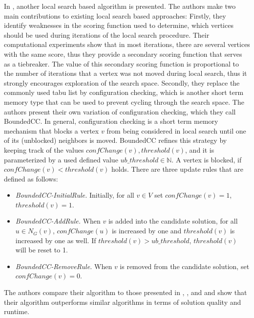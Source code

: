 \documentclass[draft,final]{vutinfth} %
\begin{document}
In \cite{chen_nuqclq_2021}, another local search based algorithm is presented. The authors make two main contributions to existing local search based approaches: Firstly, they identify weaknesses in the scoring function used to determine, which vertices should be used during iterations of the local search procedure. Their computational experiments show that in most iterations, there are several vertices with the same score, thus they provide a secondary scoring function that serves as a tiebreaker. The value of this secondary scoring function is proportional to the number of iterations that a vertex was not moved during local search, thus it strongly encourages exploration of the search space. Secondly, they replace the commonly used tabu list by configuration checking, which is another short term memory type that can be used to prevent cycling through the search space. The authors present their own variation of configuration checking, which they call BoundedCC. 
In general, configuration checking is a short term memory mechanism that blocks a vertex $v$ from being considered in local search until one of its (unblocked) neighbors is moved. BoundedCC refines this strategy by keeping track of the values $\mathit{confChange(v)}, \mathit{threshold(v)}$, and it is parameterized by a used defined value $\mathit{ub\_threshold} \in \mathbb{N}$. A vertex is blocked, if $\mathit{confChange(v)} < \mathit{threshold(v)}$ holds. There are three update rules that are defined as follows: 
\begin{itemize}
    \item \emph{BoundedCC-InitialRule.} Initially, for all $v \in V$ set $\mathit{confChange(v)} = 1$, \\$\mathit{threshold(v)} = 1$. 
    \item \emph{BoundedCC-AddRule.} When $v$ is added into the candidate solution, for all $u \in N_G(v)$, $\mathit{confChange(u)}$ is increased by one and $\mathit{threshold(v)}$ is increased by one as well. If $\mathit{threshold}(v) > \mathit{ub\_threshold}$, $\mathit{threshold(v)}$ will be reset to 1. 
    \item \emph{BoundedCC-RemoveRule.} When $v$ is removed from the candidate solution, set $confChange(v) = 0$. 
\end{itemize}
The authors compare their algorithm to those presented in \cite{pinto2021brkga}, \cite{djeddi_extension_2019}, and \cite{zhou_opposition-based_2020} and show that their algorithm outperforms similar algorithms in terms of solution quality and runtime. 
\end{document}
